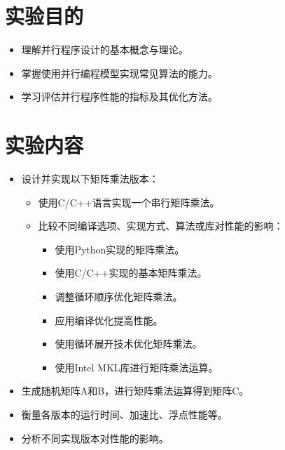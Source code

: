 \documentclass{SYSUReport}
\date{\today}
\begin{document}
\cover
\thispagestyle{empty} %
\clearpage



\section{实验目的}
\begin{itemize}
   \item 理解并行程序设计的基本概念与理论。
    \item 掌握使用并行编程模型实现常见算法的能力。
    \item 学习评估并行程序性能的指标及其优化方法。
\end{itemize}

\section{实验内容}
\begin{itemize}
    \item 设计并实现以下矩阵乘法版本：
    \begin{itemize}
        \item 使用C/C++语言实现一个串行矩阵乘法。
        \item 比较不同编译选项、实现方式、算法或库对性能的影响：
        \begin{itemize}
            \item 使用Python实现的矩阵乘法。
            \item 使用C/C++实现的基本矩阵乘法。
            \item 调整循环顺序优化矩阵乘法。
            \item 应用编译优化提高性能。
            \item 使用循环展开技术优化矩阵乘法。
            \item 使用Intel MKL库进行矩阵乘法运算。
        \end{itemize}
    \end{itemize}
    \item 生成随机矩阵A和B，进行矩阵乘法运算得到矩阵C。
    \item 衡量各版本的运行时间、加速比、浮点性能等。
    \item 分析不同实现版本对性能的影响。
\end{itemize}
\end{document}
